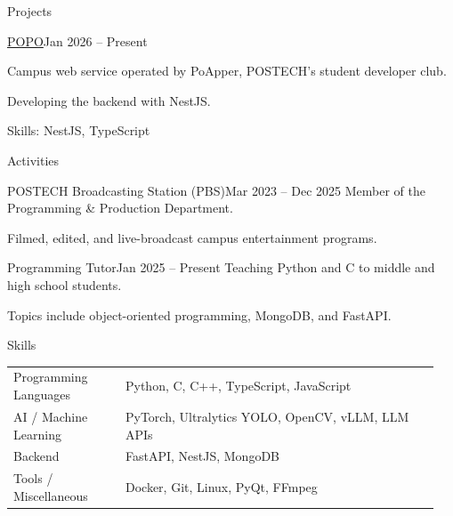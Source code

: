 \documentclass{resume}
\begin{document}
\begin{rSection}{Projects}
	\begin{rSubsection}{\href{https://popo.poapper.club/}{POPO}}{Jan 2026 -- Present}

		Campus web service operated by PoApper, POSTECH's student developer club.

		\item Developing the backend with NestJS.
		\item Skills: NestJS, TypeScript
	\end{rSubsection}
\end{rSection}

\begin{rSection}{Activities}
	\begin{rSubsection}{POSTECH Broadcasting Station (PBS)}{Mar 2023 -- Dec 2025}
		Member of the Programming \& Production Department.
		\item Filmed, edited, and live-broadcast campus entertainment programs.
	\end{rSubsection}

	\begin{rSubsection}{Programming Tutor}{Jan 2025 -- Present}
		Teaching Python and C to middle and high school students.
		\item Topics include object-oriented programming, MongoDB, and FastAPI.
	\end{rSubsection}
\end{rSection}

\begin{rSection}{Skills}
	\begin{tabular}{@{}p{0.25\linewidth}p{0.7\linewidth}}
		Programming Languages
		 & Python, C, C++, TypeScript, JavaScript                          \\ [0.3em]

		AI / Machine Learning
		 & PyTorch, Ultralytics YOLO, OpenCV, vLLM, LLM APIs               \\ [0.3em]

		Backend
		 & FastAPI, NestJS, MongoDB                                        \\ [0.3em]

		Tools / Miscellaneous
		 & Docker, Git, Linux, PyQt, FFmpeg                                \\ [0.3em]
	\end{tabular}
\end{rSection}
\end{document}
